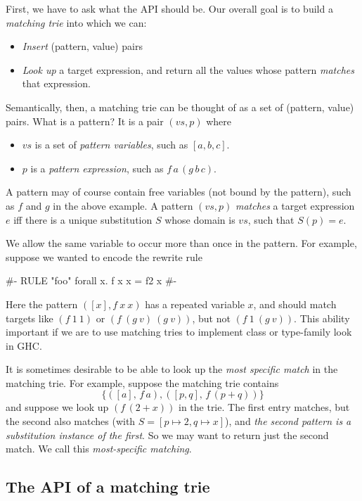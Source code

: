 \documentclass[acmsmall]{acmart}
\theoremstyle{theorem}
\theoremstyle{definition}
\theoremstyle{remark}
\begin{document}
First, we have to ask what the API should be.
Our overall goal is to build a \emph{matching trie} into which we can:
\begin{itemize}
\item \emph{Insert} (pattern, value) pairs
\item \emph{Look up} a target expression, and return all the values whose pattern \emph{matches} that expression.
\end{itemize}
Semantically, then, a matching trie can be thought of as a set of (pattern, value) pairs.
What is a pattern? It is a pair $(vs,p)$ where
\begin{itemize}
\item $vs$ is a set of \emph{pattern variables}, such as $[a,b,c]$.
\item $p$ is a \emph{pattern expression}, such as $f\, a\, (g\, b\, c)$.
\end{itemize}
A pattern may of course contain free variables (not bound by the pattern), such as $f$ and $g$
in the above example. 
A pattern $(vs, p)$ \emph{matches} a target expression $e$ iff there is a unique substitution
$S$ whose domain is $vs$, such that $S(p) = e$.

We allow the same variable to occur more than once in the pattern.
For example, suppose we wanted to encode the rewrite rule
\begin{code}
{#- RULE "foo" forall x. f x x = f2 x #-}
\end{code}
Here the pattern $([x], f~ x~ x)$ has a repeated variable $x$,
and should match targets like $(f~ 1~ 1)$ or $(f ~(g~ v)~ (g ~v))$,
but not $(f~ 1~ (g~ v))$.  This ability important if we are to use matching tries
to implement class or type-family look in GHC.

It is sometimes desirable to be able to look up the \emph{most specific match} in the matching trie.  For example, suppose the matching trie contains
$$
\{ ([a],\, f\, a), ([p,q],\, f\,(p+q)) \}
$$
and suppose we look up $(f\,(2+x))$ in the trie.  The first entry matches, but the second also matches (with $S = [p \mapsto 2, q \mapsto x]$), and \emph{the second pattern is a substitution instance of the first}.  So we may want to return just the second match.  We call this \emph{most-specific matching}.

\subsection{The API of a matching trie} \label{sec:match-api}
\end{document}
